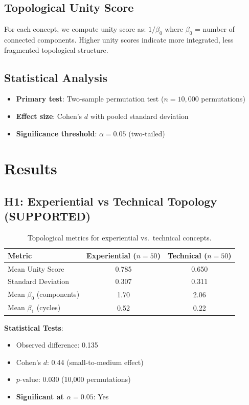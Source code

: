 \documentclass[11pt,a4paper]{article}
\newcommand{\pval}{\textit{p}}
\newcommand{\dval}{\textit{d}}
\begin{document}
\subsection{Topological Unity Score}

For each concept, we compute unity score as: $1 / \beta_0$ where $\beta_0$ = number of connected components. Higher unity scores indicate more integrated, less fragmented topological structure.

\subsection{Statistical Analysis}

\begin{itemize}
    \item \textbf{Primary test}: Two-sample permutation test ($n=10,000$ permutations)
    \item \textbf{Effect size}: Cohen's $\dval$ with pooled standard deviation
    \item \textbf{Significance threshold}: $\alpha = 0.05$ (two-tailed)
\end{itemize}

\section{Results}

\subsection{H1: Experiential vs Technical Topology (SUPPORTED)}

\begin{table}[H]
\centering
\begin{tabular}{lcc}
\toprule
\textbf{Metric} & \textbf{Experiential ($n=50$)} & \textbf{Technical ($n=50$)} \\
\midrule
Mean Unity Score & 0.785 & 0.650 \\
Standard Deviation & 0.307 & 0.311 \\
Mean $\beta_0$ (components) & 1.70 & 2.06 \\
Mean $\beta_1$ (cycles) & 0.52 & 0.22 \\
\bottomrule
\end{tabular}
\caption{Topological metrics for experiential vs.\ technical concepts.}
\label{tab:h1-results}
\end{table}

\textbf{Statistical Tests}:
\begin{itemize}
    \item Observed difference: 0.135
    \item Cohen's $\dval$: 0.44 (small-to-medium effect)
    \item $\pval$-value: 0.030 (10,000 permutations)
    \item \textbf{Significant at $\alpha = 0.05$}: Yes
\end{itemize}
\end{document}
